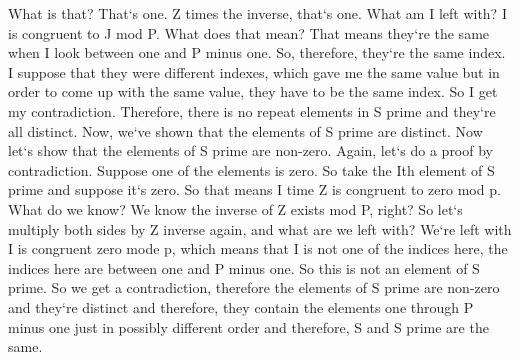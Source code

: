What is that? That`s one.
Z times the inverse, that`s one.
What am I left with? I is congruent to J mod P\@.
What does that mean? That means they`re the same when I look between one and P minus one.
So, therefore, they`re the same index.
I suppose that they were different indexes, which gave me the same value but in order to come up with the same value, they have to be the same index.
So I get my contradiction.
Therefore, there is no repeat elements in S prime and they`re all distinct.
Now, we`ve shown that the elements of S prime are distinct.
Now let`s show that the elements of S prime are non-zero.
Again, let`s do a proof by contradiction.
Suppose one of the elements is zero.
So take the Ith element of S prime and suppose it`s zero.
So that means I time Z is congruent to zero mod p.
What do we know? We know the inverse of Z exists mod P, right? So let`s multiply both sides by Z inverse again, and what are we left with? We`re left with I is congruent zero mode p, which means that I is not one of the indices here, the indices here are between one and P minus one.
So this is not an element of S prime.
So we get a contradiction, therefore the elements of S prime are non-zero and they`re distinct and therefore, they contain the elements one through P minus one just in possibly different order and therefore, S and S prime are the same.

